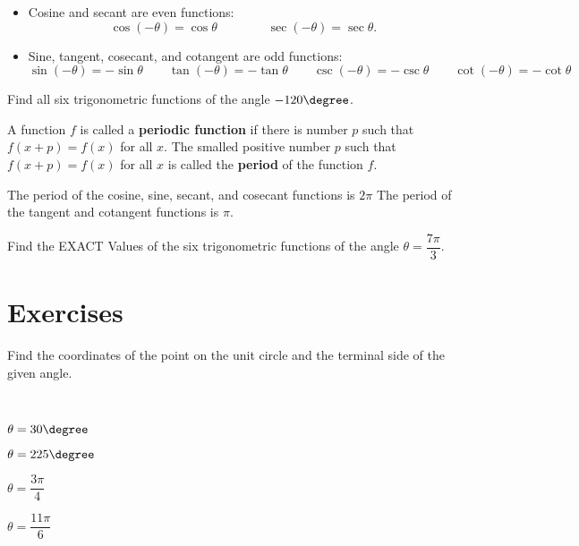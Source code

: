 \newpage

\begin{note}
  \begin{itemize}
    \item Cosine and secant are even functions:
\[\cos (-\theta) = \cos\theta \qquad\qquad 
\sec (-\theta) = \sec\theta.\]

\item Sine, tangent, cosecant, and cotangent are odd functions:
\[\sin(-\theta) =- \sin\theta \qquad 
\tan(-\theta) = -\tan\theta \qquad 
\csc (-\theta) =-\csc\theta \qquad 
\cot (-\theta) =-\cot\theta\]
\end{itemize}
\end{note}

\begin{example}
  Find all six trigonometric functions of the angle $-120\degree$.
\end{example}

\begin{definition}
  A function $f$ is called a \textbf{periodic function} if there is number $p$ such that $f(x+p)=f(x)$ for all $x$.
  The smalled positive number $p$ such that $f(x+p)=f(x)$ for all $x$ is called the \textbf{period} of the function $f$.
\end{definition}
\begin{note}
  The period of the cosine, sine, secant, and cosecant functions is $2\pi$
The period of the tangent and cotangent functions is $\pi$.
\end{note}

\begin{example}
  Find the EXACT Values of the six trigonometric functions of the angle $\theta=\dfrac{7\pi}{3}$.
\end{example}

\newpage
\section*{Exercises}
\begin{exercise}
    Find the coordinates of the point on the unit circle and the terminal side of the given angle.\\
    \begin{enumerate*}\\
      \item $\theta=30\degree$
      \item $\theta=225\degree$
      \item $\theta=\dfrac{3\pi}{4}$
      \item $\theta=\dfrac{11\pi}{6}$
    \end{enumerate*}
\end{exercise}

